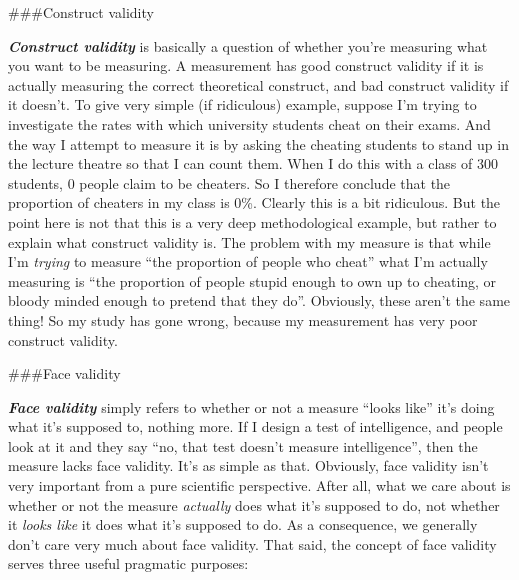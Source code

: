 \documentclass[]{book}
\begin{document}
\#\#\#Construct validity

\textbf{\emph{Construct validity}} is basically a question of whether you're measuring what you want to be measuring. A measurement has good construct validity if it is actually measuring the correct theoretical construct, and bad construct validity if it doesn't. To give very simple (if ridiculous) example, suppose I'm trying to investigate the rates with which university students cheat on their exams. And the way I attempt to measure it is by asking the cheating students to stand up in the lecture theatre so that I can count them. When I do this with a class of 300 students, 0 people claim to be cheaters. So I therefore conclude that the proportion of cheaters in my class is 0\%. Clearly this is a bit ridiculous. But the point here is not that this is a very deep methodological example, but rather to explain what construct validity is. The problem with my measure is that while I'm \emph{trying} to measure ``the proportion of people who cheat'' what I'm actually measuring is ``the proportion of people stupid enough to own up to cheating, or bloody minded enough to pretend that they do''. Obviously, these aren't the same thing! So my study has gone wrong, because my measurement has very poor construct validity.

\#\#\#Face validity

\textbf{\emph{Face validity}} simply refers to whether or not a measure ``looks like'' it's doing what it's supposed to, nothing more. If I design a test of intelligence, and people look at it and they say ``no, that test doesn't measure intelligence'', then the measure lacks face validity. It's as simple as that. Obviously, face validity isn't very important from a pure scientific perspective. After all, what we care about is whether or not the measure \emph{actually} does what it's supposed to do, not whether it \emph{looks like} it does what it's supposed to do. As a consequence, we generally don't care very much about face validity. That said, the concept of face validity serves three useful pragmatic purposes:
\end{document}
